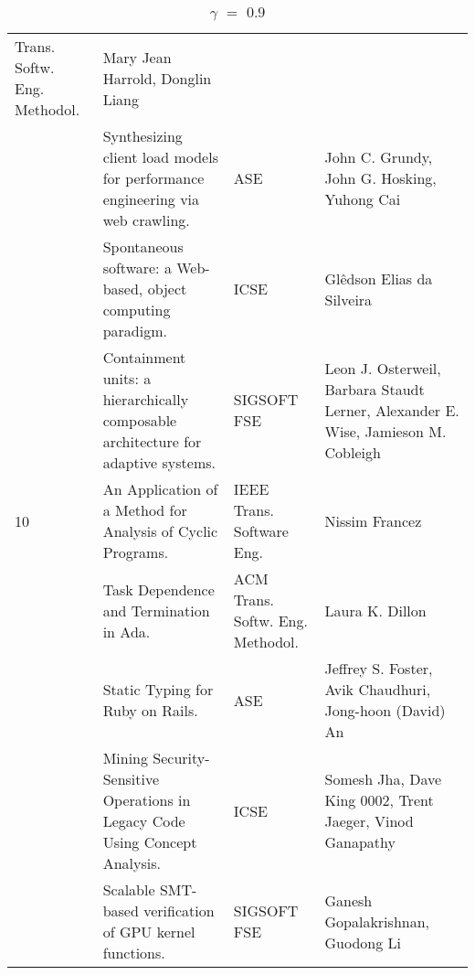 \begin{table}[h]
{\begin{tabular}{|llll|}
Trans. Softw. Eng. Methodol.& Mary Jean Harrold, Donglin Liang \\
\rowcolor{black!20} & Synthesizing client load models for performance engineering via web crawling.& 
ASE& John C. Grundy, John G. Hosking, Yuhong Cai \\
 & Spontaneous software: a Web-based, object computing paradigm.& ICSE& Glêdson Elias da Silveira \\
\rowcolor{black!20} & Containment units: a hierarchically composable architecture for adaptive 
systems.& SIGSOFT FSE& Leon J. Osterweil, Barbara Staudt Lerner, Alexander E. Wise, Jamieson M. 
Cobleigh \\
10 & An Application of a Method for Analysis of Cyclic Programs.& IEEE Trans. Software Eng.& Nissim 
Francez \\
\rowcolor{black!20} & Task Dependence and Termination in Ada.& ACM Trans. Softw. Eng. Methodol.& 
Laura K. Dillon \\
 & Static Typing for Ruby on Rails.& ASE& Jeffrey S. Foster, Avik Chaudhuri, Jong-hoon (David) An \\
\rowcolor{black!20} & Mining Security-Sensitive Operations in Legacy Code Using Concept Analysis.& 
ICSE& Somesh Jha, Dave King 0002, Trent Jaeger, Vinod Ganapathy \\
 & Scalable SMT-based verification of GPU kernel functions.& SIGSOFT FSE& Ganesh Gopalakrishnan, 
Guodong Li \\
    \hline
    \end{tabular}
  }
    \caption {$\gamma$ $=$ $0.9$}
\end{table}